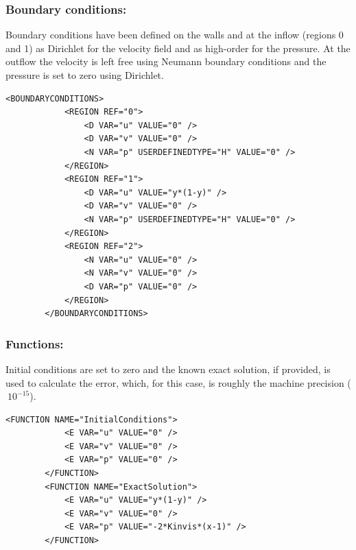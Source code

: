 \subsubsection{Boundary conditions:~} Boundary conditions have been defined on the walls and at the inflow (regions 0 and 1) as Dirichlet for the velocity field and as high-order for the pressure. At the outflow the velocity is left free using Neumann boundary conditions and the pressure is set to zero using Dirichlet.
\begin{lstlisting}[style=XMLStyle]
        <BOUNDARYCONDITIONS>
   			<REGION REF="0">
     			<D VAR="u" VALUE="0" />
     			<D VAR="v" VALUE="0" />
     			<N VAR="p" USERDEFINEDTYPE="H" VALUE="0" />
   			</REGION>
   			<REGION REF="1">
     			<D VAR="u" VALUE="y*(1-y)" />
     			<D VAR="v" VALUE="0" />
     			<N VAR="p" USERDEFINEDTYPE="H" VALUE="0" />
   			</REGION>
   			<REGION REF="2">
     			<N VAR="u" VALUE="0" />
     			<N VAR="v" VALUE="0" />
     			<D VAR="p" VALUE="0" />
   			</REGION>
		</BOUNDARYCONDITIONS>
\end{lstlisting}

\subsubsection{Functions:~} Initial conditions are set to zero and the known exact solution, if provided, is used to calculate the error, which, for this case, is roughly the machine precision ($~10^{-15}$).
\begin{lstlisting}[style=XMLStyle]
		<FUNCTION NAME="InitialConditions">
  			<E VAR="u" VALUE="0" />
  			<E VAR="v" VALUE="0" />
  			<E VAR="p" VALUE="0" />
		</FUNCTION>
		<FUNCTION NAME="ExactSolution">
  			<E VAR="u" VALUE="y*(1-y)" />
  			<E VAR="v" VALUE="0" />
  			<E VAR="p" VALUE="-2*Kinvis*(x-1)" />
		</FUNCTION>
\end{lstlisting}


